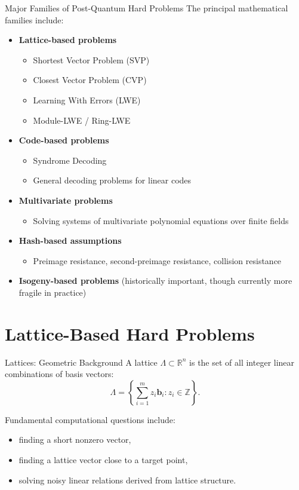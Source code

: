 \documentclass[aspectratio=169]{beamer}
\begin{document}
	\begin{frame}{Major Families of Post-Quantum Hard Problems}
		The principal mathematical families include:
		\begin{itemize}
			\item \textbf{Lattice-based problems}
			\begin{itemize}
				\item Shortest Vector Problem (SVP)
				\item Closest Vector Problem (CVP)
				\item Learning With Errors (LWE)
				\item Module-LWE / Ring-LWE
			\end{itemize}
			\item \textbf{Code-based problems}
			\begin{itemize}
				\item Syndrome Decoding
				\item General decoding problems for linear codes
			\end{itemize}
			\item \textbf{Multivariate problems}
			\begin{itemize}
				\item Solving systems of multivariate polynomial equations over finite fields
			\end{itemize}
			\item \textbf{Hash-based assumptions}
			\begin{itemize}
				\item Preimage resistance, second-preimage resistance, collision resistance
			\end{itemize}
			\item \textbf{Isogeny-based problems} (historically important, though currently more fragile in practice)
		\end{itemize}
	\end{frame}
	
	\section{Lattice-Based Hard Problems}
	
	\begin{frame}{Lattices: Geometric Background}
		A lattice $\Lambda \subset \mathbb{R}^n$ is the set of all integer linear combinations of basis vectors:
		\[
		\Lambda = \left\{ \sum_{i=1}^m z_i \bm{b}_i : z_i \in \mathbb{Z} \right\}.
		\]
		
		\vspace{0.5em}
		Fundamental computational questions include:
		\begin{itemize}
			\item finding a short nonzero vector,
			\item finding a lattice vector close to a target point,
			\item solving noisy linear relations derived from lattice structure.
		\end{itemize}
	\end{frame}
	
\end{document}
